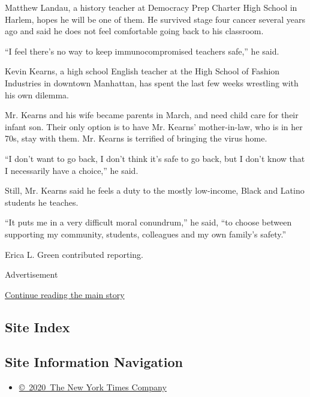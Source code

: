 Matthew Landau, a history teacher at Democracy Prep Charter High School
in Harlem, hopes he will be one of them. He survived stage four cancer
several years ago and said he does not feel comfortable going back to
his classroom.

``I feel there's no way to keep immunocompromised teachers safe,'' he
said.

Kevin Kearns, a high school English teacher at the High School of
Fashion Industries in downtown Manhattan, has spent the last few weeks
wrestling with his own dilemma.

Mr. Kearns and his wife became parents in March, and need child care for
their infant son. Their only option is to have Mr. Kearns'
mother-in-law, who is in her 70s, stay with them. Mr. Kearns is
terrified of bringing the virus home.

``I don't want to go back, I don't think it's safe to go back, but I
don't know that I necessarily have a choice,'' he said.

Still, Mr. Kearns said he feels a duty to the mostly low-income, Black
and Latino students he teaches.

``It puts me in a very difficult moral conundrum,'' he said, ``to choose
between supporting my community, students, colleagues and my own
family's safety.''

Erica L. Green contributed reporting.

Advertisement

\protect\hyperlink{after-bottom}{Continue reading the main story}

\hypertarget{site-index}{%
\subsection{Site Index}\label{site-index}}

\hypertarget{site-information-navigation}{%
\subsection{Site Information
Navigation}\label{site-information-navigation}}

\begin{itemize}
\tightlist
\item
  \href{https://help.nytimes.com/hc/en-us/articles/115014792127-Copyright-notice}{©~2020~The
  New York Times Company}
\end{itemize}

